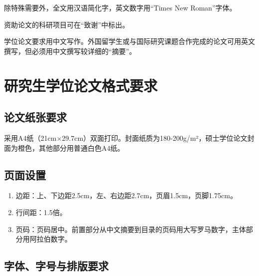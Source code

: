 除特殊需要外，全文用汉语简化字，英文数字用“Times New Roman”字体。

资助论文的科研项目可在“致谢”中标出。

学位论文要求用中文写作。外国留学生或与国际研究课题合作完成的论文可用英文撰写，但必须用中文撰写较详细的“摘要”。


\section{研究生学位论文格式要求}

\subsection{论文纸张要求}

采用A4纸（21cm×29.7cm）双面打印。封面纸质为180-200g/m²，硕士学位论文封面为橙色，其他部分用普通白色A4纸。

\subsection{页面设置}

\begin{enumerate}
  \item 边距：上、下边距2.5cm，左、右边距2.7cm，页眉1.5cm，页脚1.75cm。
  \item 行间距：1.5倍。
  \item 页码：页码居中。前置部分从中文摘要到目录的页码用大写罗马数字，主体部分用阿拉伯数字。
\end{enumerate}

\subsection{字体、字号与排版要求}

